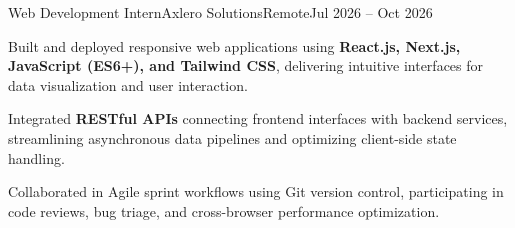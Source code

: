 \begin{cventry}{Web Development Intern}{Axlero Solutions}{Remote}{Jul 2026 -- Oct 2026}
    \item Built and deployed responsive web applications using \textbf{React.js, Next.js, JavaScript (ES6+), and Tailwind CSS}, delivering intuitive interfaces for data visualization and user interaction.
    \item Integrated \textbf{RESTful APIs} connecting frontend interfaces with backend services, streamlining asynchronous data pipelines and optimizing client-side state handling.
    \item Collaborated in Agile sprint workflows using Git version control, participating in code reviews, bug triage, and cross-browser performance optimization.
\end{cventry}

